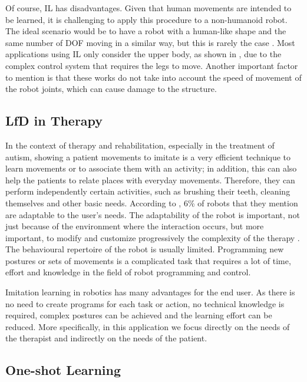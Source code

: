 \documentclass[thesis]{mas_proposal}
\begin{document}
    Of course, IL has disadvantages. Given that human movements are intended to be learned, it is challenging to apply this procedure to a non-humanoid robot. The ideal scenario would be to have a robot with a human-like shape and the same number of DOF moving in a similar way, but this is rarely the case \cite{Ravichandar2020}. Most applications using IL only consider the upper body, as shown in \cite{VanPerre2015}, due to the complex control system that requires the legs to move. Another important factor to mention is that these works do not take into account the speed of movement of the robot joints, which can cause damage to the structure. 
    
    \subsection{LfD in Therapy}
    
    In the context of therapy and rehabilitation, especially in the treatment of autism, showing a patient movements to imitate is a very efficient technique to learn movements or to associate them with an activity; in addition, this can also help the patients to relate places with everyday movements. Therefore, they can perform independently certain activities, such as brushing their teeth, cleaning themselves and other basic needs. According to \cite{Cabibihan2013}, 6\% of robots that they mention are adaptable to the user's needs. The adaptability of the robot is important, not just because of the environment where the interaction occurs, but more important, to modify and customize progressively the complexity of the therapy \cite{Dickstein2018}. The behavioural repertoire of the robot is usually limited. Programming new postures or sets of movements is a complicated task that requires a lot of time, effort and knowledge in the field of robot programming and control.
    
    Imitation learning in robotics has many advantages for the end user. As there is no need to create programs for each task or action, no technical knowledge is required, complex postures can be achieved and the learning effort can be reduced. More specifically, in this application we focus directly on the needs of the therapist \cite{Ravichandar2020, Kulikovskiy2021} and indirectly on the needs of the patient. 	
    
    \subsection{One-shot Learning}
    
\end{document}
